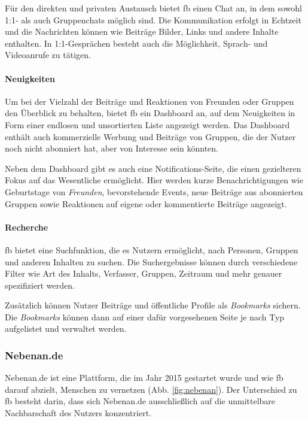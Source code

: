 Für den direkten und privaten Austausch bietet \acrshort{fb} einen Chat an, in dem sowohl 1:1- als auch Gruppenchats möglich sind. Die Kommunikation erfolgt in Echtzeit und die Nachrichten können wie Beiträge Bilder, Links und andere Inhalte enthalten. In 1:1-Gesprächen besteht auch die Möglichkeit, Sprach- und Videoanrufe zu tätigen.

\paragraph{Neuigkeiten}

Um bei der Vielzahl der Beiträge und Reaktionen von Freunden oder Gruppen den Überblick zu behalten, bietet \acrshort{fb} ein Dashboard an, auf dem Neuigkeiten in Form einer endlosen und unsortierten Liste angezeigt werden. Das Dashboard enthält auch kommerzielle Werbung und Beiträge von Gruppen, die der Nutzer noch nicht abonniert hat, aber von Interesse sein könnten.

Neben dem Dashboard gibt es auch eine Notifications-Seite, die einen gezielteren Fokus auf das Wesentliche ermöglicht. Hier werden kurze Benachrichtigungen wie Geburtstage von \textit{Freunden}, bevorstehende Events, neue Beiträge aus abonnierten Gruppen sowie Reaktionen auf eigene oder kommentierte Beiträge angezeigt.

\paragraph{Recherche}

\acrshort{fb} bietet eine Suchfunktion, die es Nutzern ermöglicht, nach Personen, Gruppen und anderen Inhalten zu suchen. Die Suchergebnisse können durch verschiedene Filter wie Art des Inhalts, Verfasser, Gruppen, Zeitraum und mehr genauer spezifiziert werden.

Zusätzlich können Nutzer Beiträge und öffentliche Profile als \textit{Bookmarks} sichern. Die \textit{Bookmarks} können dann auf einer dafür vorgesehenen Seite je nach Typ aufgelistet und verwaltet werden.

\subsubsection{Nebenan.de}

Nebenan.de ist eine Plattform, die im Jahr 2015 gestartet wurde und wie \acrshort{fb} darauf abzielt, Menschen zu vernetzen (Abb. \ref{fig:nebenan}). Der Unterschied zu \acrshort{fb} besteht darin, dass sich Nebenan.de ausschließlich auf die unmittelbare Nachbarschaft des Nutzers konzentriert.

